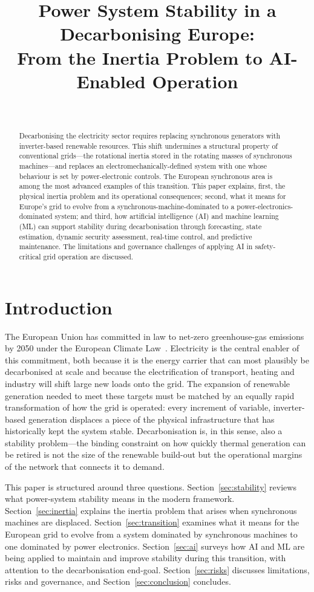\documentclass[conference]{IEEEtran}
\title{Power System Stability in a Decarbonising Europe:\\
From the Inertia Problem to AI-Enabled Operation}
\author{\IEEEauthorblockN{Judith Drack}\\
\IEEEauthorblockA{Draft prepared with assistance from an AI writing tool}}
\begin{document}
\maketitle

\begin{abstract}
Decarbonising the electricity sector requires replacing synchronous generators with inverter-based renewable resources. This shift undermines a structural property of conventional grids---the rotational inertia stored in the rotating masses of synchronous machines---and replaces an electromechanically-defined system with one whose behaviour is set by power-electronic controls. The European synchronous area is among the most advanced examples of this transition. This paper explains, first, the physical inertia problem and its operational consequences; second, what it means for Europe's grid to evolve from a synchronous-machine-dominated to a power-electronics-dominated system; and third, how artificial intelligence (AI) and machine learning (ML) can support stability during decarbonisation through forecasting, state estimation, dynamic security assessment, real-time control, and predictive maintenance. The limitations and governance challenges of applying AI in safety-critical grid operation are discussed.
\end{abstract}

\section{Introduction}\label{sec:intro}
The European Union has committed in law to net-zero greenhouse-gas emissions by 2050 under the European Climate Law~\cite{eu2021climatelaw}. Electricity is the central enabler of this commitment, both because it is the energy carrier that can most plausibly be decarbonised at scale and because the electrification of transport, heating and industry will shift large new loads onto the grid. The expansion of renewable generation needed to meet these targets must be matched by an equally rapid transformation of how the grid is operated: every increment of variable, inverter-based generation displaces a piece of the physical infrastructure that has historically kept the system stable. Decarbonisation is, in this sense, also a stability problem---the binding constraint on how quickly thermal generation can be retired is not the size of the renewable build-out but the operational margins of the network that connects it to demand.

This paper is structured around three questions. Section~\ref{sec:stability} reviews what power-system stability means in the modern framework. Section~\ref{sec:inertia} explains the inertia problem that arises when synchronous machines are displaced. Section~\ref{sec:transition} examines what it means for the European grid to evolve from a system dominated by synchronous machines to one dominated by power electronics. Section~\ref{sec:ai} surveys how AI and ML are being applied to maintain and improve stability during this transition, with attention to the decarbonisation end-goal. Section~\ref{sec:risks} discusses limitations, risks and governance, and Section~\ref{sec:conclusion} concludes.
\end{document}
